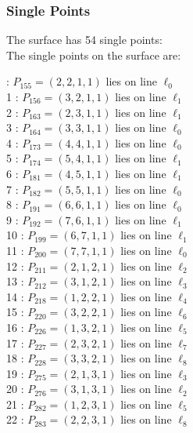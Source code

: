 \documentclass{article}
\begin{document}
{\subsubsection*{Single Points}
The surface has 54 single points:\\
The single points on the surface are:\\
\begin{multicols}{2}
 : $P_{155}=( 2, 2, 1, 1 )$ lies on line $\ell_{0}$\\
1 : $P_{156}=( 3, 2, 1, 1 )$ lies on line $\ell_{1}$\\
2 : $P_{163}=( 2, 3, 1, 1 )$ lies on line $\ell_{1}$\\
3 : $P_{164}=( 3, 3, 1, 1 )$ lies on line $\ell_{0}$\\
4 : $P_{173}=( 4, 4, 1, 1 )$ lies on line $\ell_{0}$\\
5 : $P_{174}=( 5, 4, 1, 1 )$ lies on line $\ell_{1}$\\
6 : $P_{181}=( 4, 5, 1, 1 )$ lies on line $\ell_{1}$\\
7 : $P_{182}=( 5, 5, 1, 1 )$ lies on line $\ell_{0}$\\
8 : $P_{191}=( 6, 6, 1, 1 )$ lies on line $\ell_{0}$\\
9 : $P_{192}=( 7, 6, 1, 1 )$ lies on line $\ell_{1}$\\
10 : $P_{199}=( 6, 7, 1, 1 )$ lies on line $\ell_{1}$\\
11 : $P_{200}=( 7, 7, 1, 1 )$ lies on line $\ell_{0}$\\
12 : $P_{211}=( 2, 1, 2, 1 )$ lies on line $\ell_{2}$\\
13 : $P_{212}=( 3, 1, 2, 1 )$ lies on line $\ell_{3}$\\
14 : $P_{218}=( 1, 2, 2, 1 )$ lies on line $\ell_{4}$\\
15 : $P_{220}=( 3, 2, 2, 1 )$ lies on line $\ell_{6}$\\
16 : $P_{226}=( 1, 3, 2, 1 )$ lies on line $\ell_{5}$\\
17 : $P_{227}=( 2, 3, 2, 1 )$ lies on line $\ell_{7}$\\
18 : $P_{228}=( 3, 3, 2, 1 )$ lies on line $\ell_{8}$\\
19 : $P_{275}=( 2, 1, 3, 1 )$ lies on line $\ell_{3}$\\
20 : $P_{276}=( 3, 1, 3, 1 )$ lies on line $\ell_{2}$\\
21 : $P_{282}=( 1, 2, 3, 1 )$ lies on line $\ell_{5}$\\
22 : $P_{283}=( 2, 2, 3, 1 )$ lies on line $\ell_{8}$\\

\end{multicols}}
\end{document}
